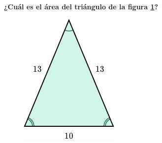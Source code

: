 \begin{multicols}{2}
    \textbf{¿Cuál es el \'area del triángulo de la figura \ref{fig:area_isoseles_02}?}

\begin{figure}[H]
    \centering
    \includegraphics[width=0.35\linewidth]{../images/area_isoseles_02}
    \caption{}
    \label{fig:area_isoseles_02}
\end{figure}
\end{multicols}\vspace{-0.5cm}
